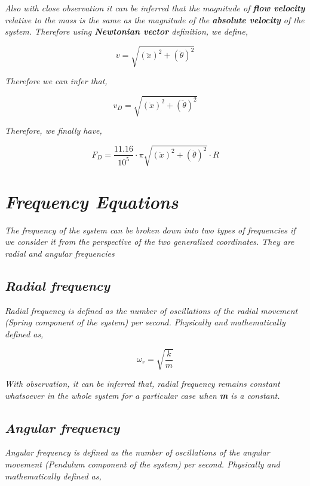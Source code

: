     \textit{Also with close observation it can be inferred that the magnitude of \textbf{flow velocity} relative to the mass is the same as the magnitude of the \textbf{absolute velocity} of the system. Therefore using \textbf{Newtonian vector} definition, we define,}
            
        $$v = \sqrt{(\ddot{x})^2 + (\ddot{\theta})^2}$$
        
    \textit{Therefore we can infer that,}
        
        $$v_D = \sqrt{(\ddot{x})^2 + (\ddot{\theta})^2}$$
            
    \textit{Therefore, we finally have,}
            
        $$F_D = \frac{11.16}{10^{5}}\cdot\pi\sqrt{(\ddot{x})^2 + (\ddot{\theta})^2}\cdot R$$
            
\section{\textit{Frequency Equations}}
            
    \textit{The frequency of the system can be broken down into two types of frequencies if we consider it from the perspective of the two generalized coordinates. They are radial and angular frequencies}
            
    \subsection{\textit{Radial frequency}}
                
        \textit{Radial frequency is defined as the number of oscillations of the radial movement (Spring component of the system) per second. Physically and mathematically defined as,}
                
            $$\omega_r = \sqrt{\frac{k}{m}}$$
                
        \textit{With observation, it can be inferred that, radial frequency remains constant whatsoever in the whole system for a particular case when \textbf{m} is a constant.}
            
    \subsection{\textit{Angular frequency}}
                
        \textit{Angular frequency is defined as the number of oscillations of the angular movement (Pendulum component of the system) per second. Physically and mathematically defined as,}
                
